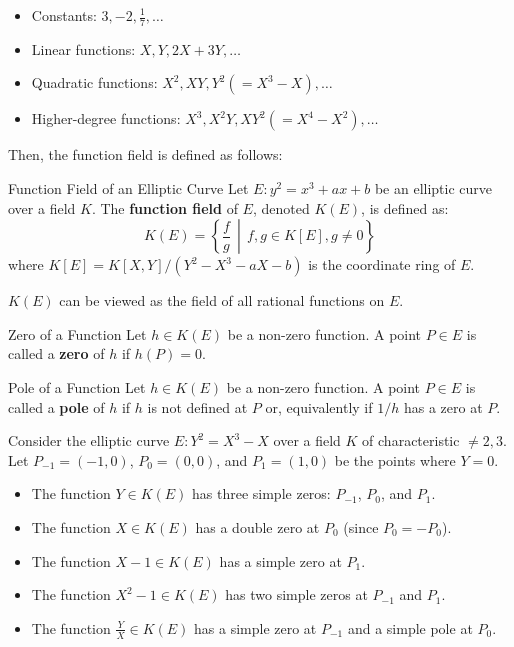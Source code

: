 \documentclass{article}
\begin{document}
\begin{itemize}
    \item Constants: $3, -2, \frac{1}{7}, \ldots$
    \item Linear functions: $X, Y, 2X+3Y, \ldots$
    \item Quadratic functions: $X^2, XY, Y^2 (= X^3 - X), \ldots$
    \item Higher-degree functions: $X^3, X^2Y, XY^2 (= X^4 - X^2), \ldots$
\end{itemize}

Then, the function field is defined as follows:

\begin{definition}{Function Field of an Elliptic Curve}{}
Let $E: y^2 = x^3 + ax + b$ be an elliptic curve over a field $K$. The \textbf{function field} of $E$, denoted $K(E)$, is defined as:
\begin{equation}
    K(E) = \left\{\frac{f}{g} \,\middle|\, f, g \in K[E], g \neq 0 \right\}
\end{equation}
where $K[E] = K[X, Y]/(Y^2 - X^3 - aX - b)$ is the coordinate ring of $E$.
\end{definition}

$K(E)$ can be viewed as the field of all rational functions on $E$.

\begin{definition}{Zero of a Function}{}
Let $h \in K(E)$ be a non-zero function. A point $P \in E$ is called a \textbf{zero} of $h$ if $h(P) = 0$.
\end{definition}

\begin{definition}{Pole of a Function}{}
Let $h \in K(E)$ be a non-zero function. A point $P \in E$ is called a \textbf{pole} of $h$ if $h$ is not defined at $P$ or, equivalently if $1/h$ has a zero at $P$.
\end{definition}

Consider the elliptic curve $E: Y^2 = X^3 - X$ over a field $K$ of characteristic $\neq 2, 3$. Let $P_{-1} = (-1, 0)$, $P_0 = (0, 0)$, and $P_1 = (1, 0)$ be the points where $Y = 0$.

\begin{itemize}
    \item The function $Y \in K(E)$ has three simple zeros: $P_{-1}$, $P_0$, and $P_1$.
    \item The function $X \in K(E)$ has a double zero at $P_0$ (since $P_0 = -P_0$).
    \item The function $X - 1 \in K(E)$ has a simple zero at $P_1$.
    \item The function $X^2 - 1 \in K(E)$ has two simple zeros at $P_{-1}$ and $P_1$.
    \item The function $\frac{Y}{X} \in K(E)$ has a simple zero at $P_{-1}$ and a simple pole at $P_0$.
\end{itemize}
\end{document}
